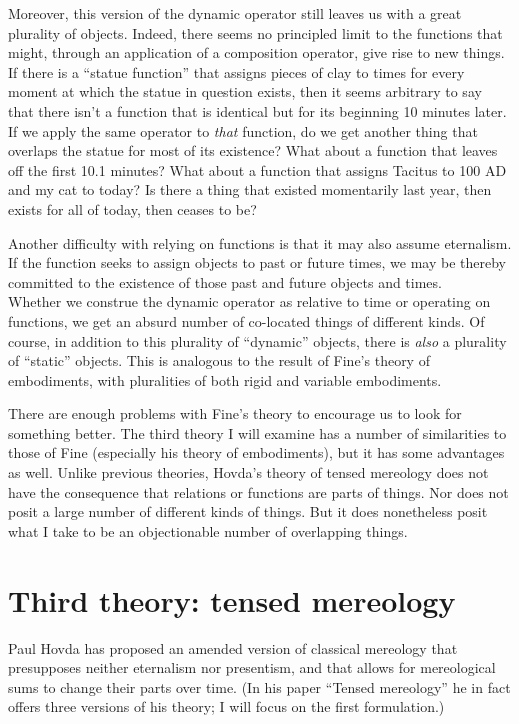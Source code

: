 \documentclass[11pt]{article}
\begin{document}
\begin{spacing}{1.5}
Moreover, this version of the dynamic operator still leaves us with a
great plurality of objects.  Indeed, there seems no principled limit
to the functions that might, through an application of a composition
operator, give rise to new things.  If there is a ``statue function''
that assigns pieces of clay to times for every moment at which the
statue in question exists, then it seems arbitrary to say that there
isn't a function that is identical but for its beginning 10 minutes
later.  If we apply the same operator to {\em that} function, do we
get another thing that overlaps the statue for most of its existence?
What about a function that leaves off the first 10.1 minutes?  What
about a function that assigns Tacitus to 100 AD and my cat to today?
Is there a thing that existed momentarily last year, then exists for
all of today, then ceases to be?

Another difficulty with relying on functions is that it may also
assume eternalism.  If the function seeks to assign objects to past or
future times, we may be thereby committed to the existence of those
past and future objects and times.\\

Whether we construe the dynamic operator as relative to time or
operating on functions, we get an absurd number of co-located things
of different kinds.  Of course, in addition to this plurality of
``dynamic'' objects, there is {\em also} a plurality of ``static''
objects.  This is analogous to the result of Fine's theory of
embodiments, with pluralities of both rigid and variable embodiments.

There are enough problems with Fine's theory to encourage us to look
for something better.  The third theory I will examine has a number of
similarities to those of Fine (especially his theory of embodiments),
but it has some advantages as well.  Unlike previous theories, Hovda's
theory of tensed mereology does not have the consequence that
relations or functions are parts of things.  Nor does not posit a
large number of different kinds of things.  But it does nonetheless
posit what I take to be an objectionable number of overlapping things.

\section{Third theory: tensed mereology}
\label{hovda}
Paul Hovda has proposed an amended version of classical mereology that
presupposes neither eternalism nor presentism, and that allows for
mereological sums to change their parts over time.  (In his paper
``Tensed mereology'' \citeyearpar{hovda2011} he in fact offers three
versions of his theory; I will focus on the first formulation.)


\end{spacing}
\end{document}
